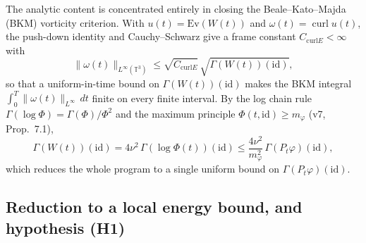 \documentclass[11pt]{article}
\theoremstyle{definition}
\begin{document}
The analytic content is concentrated entirely in closing the
Beale--Kato--Majda (BKM) vorticity criterion. With $u(t)=\mathrm{Ev}(W(t))$ and
$\omega(t)=\operatorname{curl}u(t)$, the push-down identity and Cauchy--Schwarz
give a frame constant $C_{\mathrm{curl}E}<\infty$ with
\begin{equation}
  \|\omega(t)\|_{L^\infty(\mathbb{T}^3)}
    \le \sqrt{C_{\mathrm{curl}E}}\,\sqrt{\Gamma(W(t))(\mathrm{id})},
  \label{eq:vort}
\end{equation}
so that a uniform-in-time bound on $\Gamma(W(t))(\mathrm{id})$ makes the BKM
integral $\int_0^T \|\omega(t)\|_{L^\infty}\,dt$ finite on every finite interval.
By the log chain rule $\Gamma(\log\Phi)=\Gamma(\Phi)/\Phi^2$ and the maximum
principle $\Phi(t,\mathrm{id})\ge m_\varphi$ (v7, Prop.~7.1),
\begin{equation}
  \Gamma(W(t))(\mathrm{id})
    = 4\nu^2\,\Gamma(\log\Phi(t))(\mathrm{id})
    \le \frac{4\nu^2}{m_\varphi^2}\,\Gamma(P_t\varphi)(\mathrm{id}),
  \label{eq:logbound}
\end{equation}
which reduces the whole program to a single uniform bound on
$\Gamma(P_t\varphi)(\mathrm{id})$.

\subsection{Reduction to a local energy bound, and hypothesis (H1)}
\end{document}
